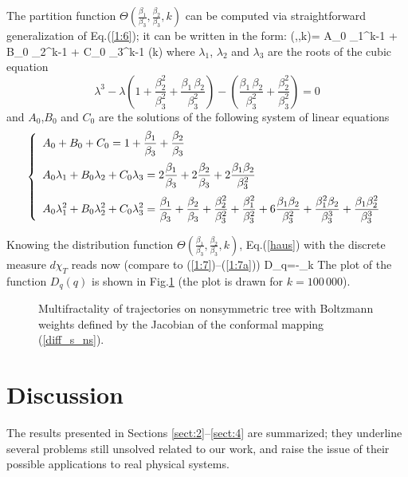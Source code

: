 The partition function $\Theta\left(\frac{\beta_1}{\beta_3},
\frac{\beta_2}{\beta_3},k\right)$ can be computed via straightforward
generalization of Eq.(\ref{1:6}); it can be written in the form:
\be
\Theta\left(,,k\right)=
A_0 \lambda_1^{k-1} + B_0 \lambda_2^{k-1} +  C_0 \lambda_3^{k-1} \qquad
(k)
\ee
where
$\lambda_1$, $\lambda_2$ and $\lambda_3$ are the roots of the cubic
equation
$$
\lambda^3-\lambda\left(1+\frac{\beta_2^2}{\beta_3^2}+
\frac{\beta_1\,\beta_2}{\beta_3^2}\right)-
\left(\frac{\beta_1\,\beta_2}{\beta_3^2}+
\frac{\beta_2^2}{\beta_3^2}\right)=0
$$
and $A_0$,$B_0$ and $C_0$ are the solutions of the following system of linear
equations
$$
\left\{\begin{array}{l}
\disp A_0+B_0+C_0=1+\frac{\beta_1}{\beta_3}+\frac{\beta_2}{\beta_3}
\medskip \\
\disp A_0 \lambda_1 + B_0 \lambda_2 +  C_0 \lambda_3=
2\frac{\beta_1}{\beta_3}+2\frac{\beta_2}{\beta_3}+
2\frac{\beta_1\beta_2}{\beta_3^2}
\medskip \\
\disp A_0 \lambda_1^2 + B_0 \lambda_2^2 +  C_0 \lambda_3^2=
\frac{\beta_1}{\beta_3}+\frac{\beta_2}{\beta_3}+
\frac{\beta_2^2}{\beta_3^2}+\frac{\beta_1^2}{\beta_3^2}+
6\frac{\beta_1\beta_2}{\beta_3^2}+\frac{\beta_1^2\beta_2}{\beta_3^3}+
\frac{\beta_1\beta_2^2}{\beta_3^3}
\end{array}\right.
$$

Knowing the distribution function $\Theta\left(\frac{\beta_1}{\beta_3},
\frac{\beta_2}{\beta_3},k\right)$, Eq.(\ref{haus}) with the discrete measure 
$d\chi_T$ reads now (compare to (\ref{1:7})--(\ref{1:7a}))
\be \label{haus2}
D_q=-\lim_{k\to\infty}
\ee
The plot of the function $D_q(q)$ is shown in Fig.\ref{fig:haus2} (the 
plot is drawn for $k=100\,000$).

\begin{figure}
\centerline{}
\caption{Multifractality of trajectories on nonsymmetric tree with Boltzmann
weights defined by the Jacobian of the conformal mapping (\ref{diff_s_ns}).}
\label{fig:haus2}
\end{figure}

\section{Discussion}
The results presented  in Sections \ref{sect:2}--\ref{sect:4} are summarized; they underline several problems still unsolved related to our work,  and raise the issue of their possible applications to real physical systems.

